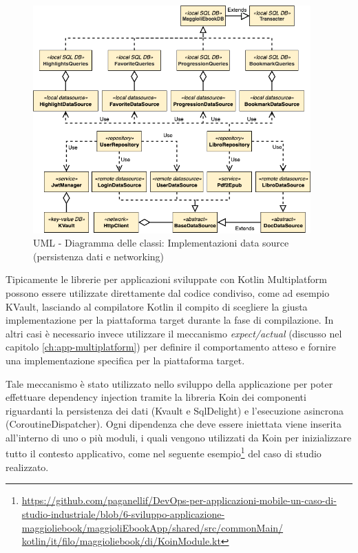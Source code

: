 \begin{figure}[H]
    \centering
    \includegraphics[width=0.95\textwidth]{img/uml-network-db.png}
    \caption{UML - Diagramma delle classi: Implementazioni data source (persistenza dati e networking)}
\end{figure}

Tipicamente le librerie per applicazioni sviluppate con Kotlin Multiplatform possono essere utilizzate direttamente dal codice condiviso, come ad esempio KVault, lasciando al compilatore Kotlin il compito di scegliere la giusta implementazione per la piattaforma target durante la fase di compilazione. In altri casi è necessario invece utilizzare il meccanismo \textit{expect/actual} (discusso nel capitolo \ref{ch:app-multiplatform}) per definire il comportamento atteso e fornire una implementazione specifica per la piattaforma target.

Tale meccanismo è stato utilizzato nello sviluppo della applicazione per poter effettuare dependency injection tramite la libreria Koin dei componenti riguardanti la persistenza dei dati (Kvault e SqlDelight) e l'esecuzione asincrona (CoroutineDispatcher). Ogni dipendenza che deve essere iniettata viene inserita all'interno di uno o più moduli, i quali vengono utilizzati da Koin per inizializzare tutto il contesto applicativo, come nel seguente esempio\footnote{\href{https://github.com/paganellif/DevOps-per-applicazioni-mobile-un-caso-di-studio-industriale/blob/6-sviluppo-applicazione-maggioliebook/maggioliEbookApp/shared/src/commonMain/kotlin/it/filo/maggioliebook/di/KoinModule.kt}{https://github.com/paganellif/DevOps-per-applicazioni-mobile-un-caso-di-studio-industriale/blob/6-sviluppo-applicazione-maggioliebook/maggioliEbookApp/shared/src/commonMain/\\kotlin/it/filo/maggioliebook/di/KoinModule.kt}} del caso di studio realizzato. 

